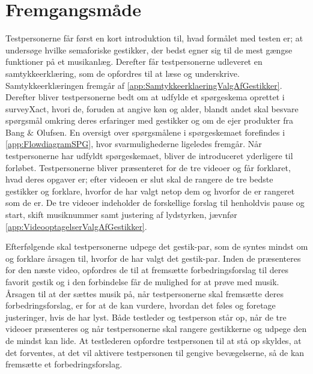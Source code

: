 \section{Fremgangsmåde}
\label{FremgangsmaadeValgAfGestikker}
%
Testpersonerne får først en kort introduktion til, hvad formålet med testen er; at undersøge hvilke semaforiske gestikker, der bedst egner sig til de mest gængse funktioner på et musikanlæg. Derefter får testpersonerne udleveret en samtykkeerklæring, som de opfordres til at læse og underskrive. Samtykkeerklæringen fremgår af \autoref{app:SamtykkeerklaeringValgAfGestikker}. Derefter bliver testpersonerne bedt om at udfylde et spørgeskema oprettet i surveyXact, hvori de, foruden at angive køn og alder, blandt andet skal besvare spørgsmål omkring deres erfaringer med gestikker og om de ejer produkter fra Bang $\&$ Olufsen. En oversigt over spørgsmålene i spørgeskemaet forefindes i \autoref{app:FlowdiagramSPG}, hvor svarmulighederne ligeledes fremgår. Når testpersonerne har udfyldt spørgeskemaet, bliver de introduceret yderligere til forløbet. Testpersonerne bliver præsenteret for de tre videoer og får forklaret, hvad deres opgaver er; efter videoen er slut skal de rangere de tre bedste gestikker og forklare, hvorfor de har valgt netop dem og hvorfor de er rangeret som de er. De tre videoer indeholder de forskellige forslag til henholdvis pause og start, skift musiknummer samt justering af lydstyrken, jævnfør \autoref{app:VideooptagelserValgAfGestikker}. 

Efterfølgende skal testpersonerne udpege det gestik-par, som de syntes mindst om og forklare årsagen til, hvorfor de har valgt det gestik-par. Inden de præsenteres for den næste video, opfordres de til at fremsætte forbedringsforslag til deres favorit gestik og i den forbindelse får de mulighed for at prøve med musik. Årsagen til at der sættes musik på, når testpersonerne skal fremsætte deres forbedringsforslag, er for at de kan vurdere, hvordan det føles og foretage justeringer, hvis de har lyst. Både testleder og testperson står op, når de tre videoer præsenteres og når testpersonerne skal rangere gestikkerne og udpege den de mindst kan lide. At testlederen opfordre testpersonen til at stå op skyldes, at det forventes, at det vil aktivere testpersonen til gengive bevægelserne, så de kan fremsætte et forbedringsforslag. 

